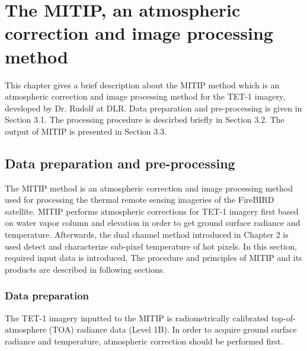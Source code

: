 \chapter{The MITIP, an atmospheric correction and image processing method}

\label{Chapter3}

This chapter gives a brief description about the MITIP method which is an atmospheric correction and image processing method for the TET-1 imagery, developed by Dr. Rudolf at DLR. Data preparation and pre-processing is given in Section 3.1. The processing procedure is descirbed briefly in Section 3.2. The output of MITIP is presented in Section 3.3.\\


\section{Data preparation and pre-processing}
The MITIP method is an atmospheric correction and image processing method used for processing the thermal remote sensing imageries of the FireBIRD satellite. MITIP performs atmospheric corrections for TET-1 imagery first based on water vapor column and elevation in order to get ground surface radiance and temperature. Afterwards, the dual channel method introduced in Chapter 2 is used detect and characterize sub-pixel temperature of hot pixels. In this section, required input data is introduced. The procedure and principles of MITIP and its products are described in following sections.\\


\subsection{Data preparation}
The TET-1 imagery inputted to the MITIP is radiometrically calibrated top-of-atmosphere (TOA) radiance data (Level 1B). In order to acquire ground surface radiance and temperature, atmospheric correction should be performed first.\\

